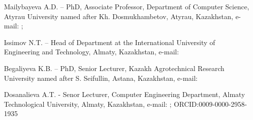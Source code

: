 Mailybayeva A.D. -- PhD, Associate Professor, Department of Computer
Science, Atyrau University named after Kh. Dosmukhambetov, Atyrau,
Kazakhstan, e-mail:
\href{mailto:a.maylibayeva@asu.edu.kz}{};

Issimov N.T. -- Head of Department at the International University of
Engineering and Technology, Almaty, Kazakhstan, e-mail:


Begaliyeva K.B. -- PhD, Senior Lecturer, Kazakh Agrotechnical Research
University named after S. Seifullin, Astana, Kazakhstan, e-mail:
\href{mailto:kalamkas_b@mail.ru}{}

Dosanalieva A.T. - Senor Lecturer, Computer Engineering Department,
Almaty Technological University, Almaty, Kazakhstan, e-mail:
\href{mailto:Dosanalieva1985@gmail.com}{};
ORCID:0009-0000-2958-1935\
